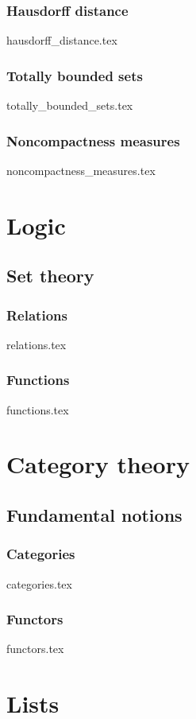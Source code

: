 \documentclass[numbers=endperiod, bibliography=totocnumbered]{scrartcl}
\begin{document}
\subsubsection{Hausdorff distance}\label{sec:hausdorff_distance}
{hausdorff_distance.tex}
\subsubsection{Totally bounded sets}\label{sec:totally_bounded_sets}
{totally_bounded_sets.tex}
\subsubsection{Noncompactness measures}\label{sec:noncompactness_measures}
{noncompactness_measures.tex}

\section{Logic}\label{sec:logic}
\subsection{Set theory}\label{sec:sets}
\subsubsection{Relations}\label{sec:relations}
{relations.tex}
\subsubsection{Functions}\label{sec:functions}
{functions.tex}

\section{Category theory}\label{sec:category_theory}
\subsection{Fundamental notions}\label{sec:category_theory/fundamental_notions}
\subsubsection{Categories}\label{sec:category}
{categories.tex}
\subsubsection{Functors}\label{sec:functor}
{functors.tex}

\section{Lists}

\listofaoc
\listoflem
\listofusc

\printbibliography
\end{document}
